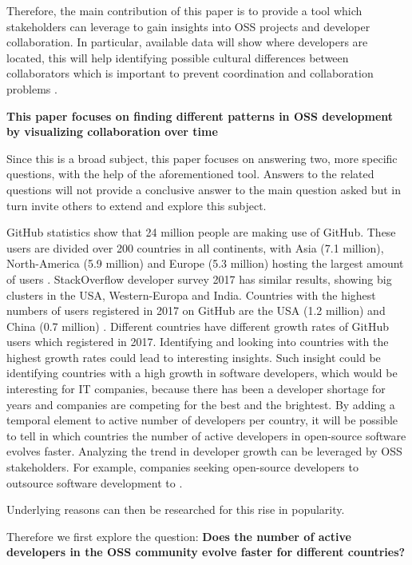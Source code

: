 \documentclass[acmtog, authorversion]{acmart}
\begin{document}
Therefore, the main contribution of this paper is to provide a tool which stakeholders can leverage to gain insights into OSS projects and developer collaboration.
In particular, available data will show where developers are located, this will help identifying possible cultural differences between collaborators which is important to prevent coordination and collaboration problems \cite{Mishra2014}.

\textbf{This paper focuses on finding different patterns in OSS development by visualizing collaboration over time}

Since this is a broad subject, this paper focuses on answering two, more specific questions, with the help of the aforementioned tool.
Answers to the related questions will not provide a conclusive answer to the main question asked but in turn invite others to extend and explore this subject.

GitHub statistics show that 24 million people are making use of GitHub. 
These users are divided over 200 countries in all continents, with Asia (7.1 million), North-America (5.9 million) and Europe (5.3 million) hosting the largest amount of users \cite{GHOctoverse}.
StackOverflow developer survey 2017 \cite{StackOverflow2017} has similar results, showing big clusters in the USA, Western-Europa and India.
Countries with the highest numbers of users registered in 2017 on GitHub are the USA (1.2 million) and China (0.7 million) \cite{GHOctoverse}.
Different countries have different growth rates of GitHub users which registered in 2017. 
Identifying and looking into countries with the highest growth rates could lead to interesting insights.
Such insight could be identifying countries with a high growth in software developers, which would be interesting for IT companies, because there has been a developer shortage for years and companies are competing for the best and the brightest.
By adding a temporal element to active number of developers per country, it will be possible to tell in which countries the number of active developers in open-source software evolves faster.
Analyzing the trend in developer growth can be leveraged by OSS stakeholders. For example, companies seeking open-source developers to outsource software development to \cite{haefliger2008code}.

Underlying reasons can then be researched for this rise in popularity.

Therefore we first explore the question: \textbf{Does the number of active developers in the OSS community evolve faster for different countries?}
\end{document}
